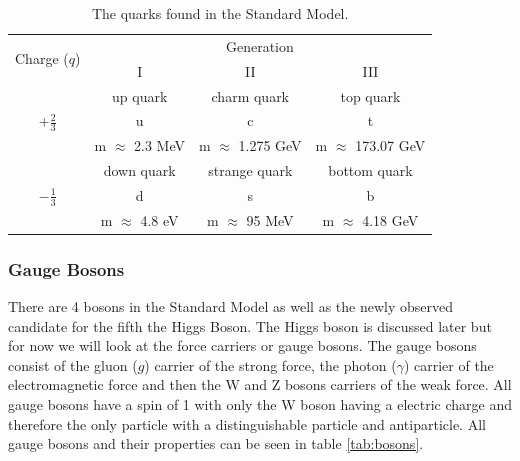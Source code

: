    \begin {table}[h]
        \begin{center}
        \begin{tabular}{|c|c|c|c|}
            \hline
            \multirow{2}{*}{Charge ($q$)}      & \multicolumn{3}{c|}{Generation} \\
            \cline{2-4}
                                & I     & II    & III   \\
            \hline
            \multirow{3}{*}{\Large $+\frac{2}{3}$} & up quark & charm quark & top quark \\
                                & {\Huge u}             & {\Huge c}             & {\Huge t} \\
                                & m $\approx$ 2.3 MeV   & m $\approx$ 1.275 GeV & m $\approx$ 173.07 GeV \\
            \hline
            \multirow{3}{*}{\Large $-\frac{1}{3}$}  & down quark & strange quark & bottom quark \\
                                & {\Huge d}             & {\Huge s}             & {\Huge b}     \\
                                & m $\approx$ 4.8 eV    & m $\approx$ 95 MeV    & m $\approx$ 4.18 GeV \\
            \hline
        \end{tabular}
        \caption{The quarks found in the Standard Model.}
        \label{tab:quarks}
        \end{center}
    \end {table}



    \subsubsection*{Gauge Bosons}
    There are 4 bosons in the Standard Model as well as the newly observed candidate for the fifth the Higgs Boson. The Higgs boson is discussed later but for now we will look at the force carriers or gauge bosons. The gauge bosons consist of the gluon ($g$) carrier of the strong force, the photon ($\gamma$) carrier of the electromagnetic force and then the W and Z bosons carriers of the weak force. All gauge bosons have a spin of 1 with only the W boson having a electric charge and therefore the only particle with a distinguishable particle and antiparticle. All gauge bosons and their properties can be seen in table \ref{tab:bosons}.\\

